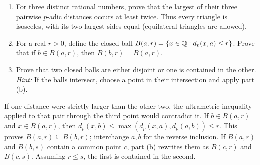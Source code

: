 \begin{enumerate}
 \item For three distinct rational numbers, prove that the largest of
 their three pairwise $p$-adic distances occurs at least twice. Thus every
 triangle is isosceles, with its two largest sides equal (equilateral
 triangles are allowed). 
 \item For a real $r>0$, define the closed ball
 $B(a,r)=\{x\in\mathbb Q:d_p(x,a)\le r\}$. Prove that if $b\in B(a,r)$,
 then $B(b,r)=B(a,r)$. 
 \item Prove that two closed balls are either disjoint or one is contained
 in the other. \emph{Hint:} If the balls intersect, choose a point in their
 intersection and apply part (b). 
\end{enumerate}
\begin{solution}
If one distance were strictly larger than the other two, the ultrametric
inequality applied to that pair through the third point would contradict it.
If $b\in B(a,r)$ and $x\in B(a,r)$, then
$d_p(x,b)\le\max(d_p(x,a),d_p(a,b))\le r$.
This proves $B(a,r)\subseteq B(b,r)$; interchange $a,b$ for the reverse inclusion.
If $B(a,r)$ and $B(b,s)$ contain a common point $c$, part (b) rewrites
them as $B(c,r)$ and $B(c,s)$. Assuming $r\le s$, the first is contained
in the second.
\end{solution}

